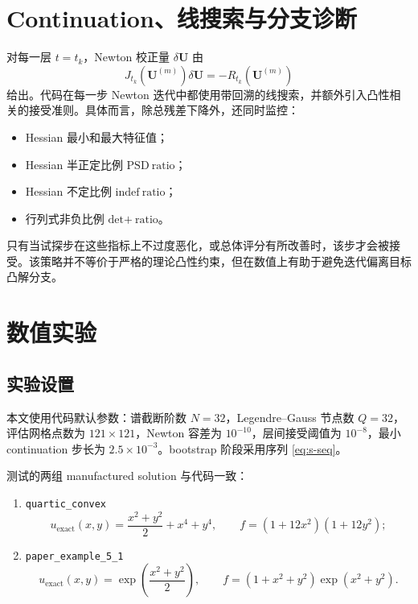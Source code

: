 \documentclass[11pt,a4paper]{article}
\begin{document}
\section{Continuation、线搜索与分支诊断}
对每一层 $t=t_k$，Newton 校正量 $\delta\bm U$ 由
\begin{equation}
J_{t_k}(\bm U^{(m)})\delta\bm U=-R_{t_k}(\bm U^{(m)})
\label{eq:newton}
\end{equation}
给出。代码在每一步 Newton 迭代中都使用带回溯的线搜索，并额外引入凸性相关的接受准则。具体而言，除总残差下降外，还同时监控：
\begin{itemize}[leftmargin=2em]
\item Hessian 最小和最大特征值；
\item Hessian 半正定比例 $\mathrm{PSD\ ratio}$；
\item Hessian 不定比例 $\mathrm{indef\ ratio}$；
\item 行列式非负比例 $\mathrm{det\texttt{+}\ ratio}$。
\end{itemize}
只有当试探步在这些指标上不过度恶化，或总体评分有所改善时，该步才会被接受。该策略并不等价于严格的理论凸性约束，但在数值上有助于避免迭代偏离目标凸解分支。

\section{数值实验}
\subsection{实验设置}
本文使用代码默认参数：谱截断阶数 $N=32$，Legendre--Gauss 节点数 $Q=32$，评估网格点数为 $121\times121$，Newton 容差为 $10^{-10}$，层间接受阈值为 $10^{-8}$，最小 continuation 步长为 $2.5\times 10^{-3}$。bootstrap 阶段采用序列 \eqref{eq:s-seq}。

测试的两组 manufactured solution 与代码一致：
\begin{enumerate}[leftmargin=2em]
\item \texttt{quartic\_convex}
\[
u_{\mathrm{exact}}(x,y)=\frac{x^2+y^2}{2}+x^4+y^4,
\qquad
f=(1+12x^2)(1+12y^2);
\]
\item \texttt{paper\_example\_5\_1}
\[
u_{\mathrm{exact}}(x,y)=\exp\!\left(\frac{x^2+y^2}{2}\right),
\qquad
f=(1+x^2+y^2)\exp(x^2+y^2).
\]
\end{enumerate}

\begin{table}[htbp]
\centering
\caption{两组算例在默认参数下的最终结果概览}
\label{tab:summary}
\end{table}
\end{document}
